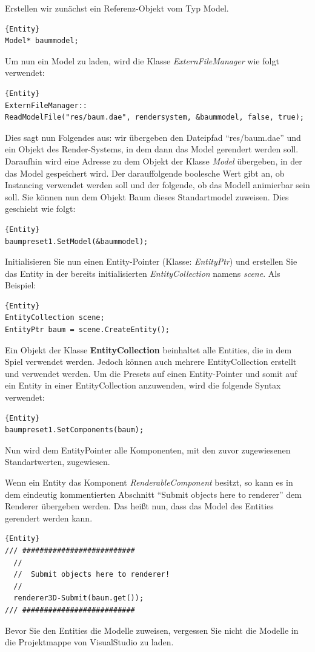 Erstellen wir zunächst ein Referenz-Objekt vom Typ Model.
\begin{lstlisting}{Entity}
Model* baummodel;
\end{lstlisting}
Um nun ein Model zu laden, wird die Klasse \textit{ExternFileManager} wie folgt verwendet:
\begin{lstlisting}{Entity}
ExternFileManager::
ReadModelFile("res/baum.dae", rendersystem, &baummodel, false, true);
\end{lstlisting}
Dies sagt nun Folgendes aus:
wir übergeben den Dateipfad "`res/baum.dae"' und ein Objekt des Render-Systems, in dem dann das Model gerendert werden soll. Daraufhin wird eine Adresse zu dem Objekt der Klasse \textit{Model} übergeben, in der das Model gespeichert wird. Der darauffolgende boolesche Wert gibt an, ob Instancing verwendet werden soll und der folgende, ob das Modell animierbar sein soll. Sie können nun dem Objekt Baum dieses Standartmodel zuweisen. Dies geschieht wie folgt:
\begin{lstlisting}{Entity}
baumpreset1.SetModel(&baummodel);
\end{lstlisting}
Initialisieren Sie nun einen Entity-Pointer (Klasse: \textit{EntityPtr}) und erstellen Sie das Entity in der bereits initialisierten \textit{EntityCollection} namens \textit{scene}. Als Beispiel:
\begin{lstlisting}{Entity}
EntityCollection scene;
EntityPtr baum = scene.CreateEntity();
\end{lstlisting}
Ein Objekt der Klasse \textbf{EntityCollection} beinhaltet alle Entities, die in dem Spiel verwendet werden. Jedoch können auch mehrere EntityCollection erstellt und verwendet werden.
Um die Presets auf einen Entity-Pointer und somit auf ein Entity in einer EntityCollection anzuwenden, wird die folgende Syntax verwendet:
\begin{lstlisting}{Entity}
baumpreset1.SetComponents(baum);
\end{lstlisting}
Nun wird dem EntityPointer alle Komponenten, mit den zuvor zugewiesenen Standartwerten, zugewiesen.

Wenn ein Entity das Komponent \textit{RenderableComponent} besitzt, so kann es in dem eindeutig kommentierten Abschnitt "`Submit objects here to renderer"' dem Renderer übergeben werden. Das heißt nun, dass das Model des Entities gerendert werden kann.
\begin{lstlisting}{Entity}
/// ##########################
  //
  //  Submit objects here to renderer!
  //
  renderer3D-Submit(baum.get());
/// ##########################
\end{lstlisting}
Bevor Sie den Entities die Modelle zuweisen, vergessen Sie nicht die Modelle in die Projektmappe von VisualStudio zu laden.

